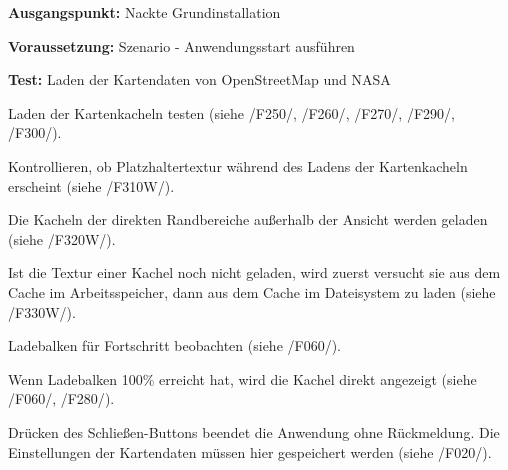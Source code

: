 \documentclass[10pt]{scrreprt}
\newcommand{\sfbf}[1]{\textbf{\sffamily #1}}
\newcommand{\ziel}[1]{{\fontsize{9.5}{11}\textsf{/#1/}}}
\newcommand{\ziellabel}{Z}
\newcommand{\muss}{\renewcommand{\labelenumi}{\textbf{\ziel{\ziellabel\numprint{\theenumi}0}}}}
\newcommand{\wunsch}{\renewcommand{\labelenumi}{\textbf{\ziel{\ziellabel\numprint{\theenumi}0W}}}}
\newenvironment{details}[1][6pt]{%
  \parskip#1 \parindent6mm \raggedright%
  \def\item{\par\ignorespaces\hangindent=5mm \hangafter1}}{%
  \par\ignorespaces}
\begin{document}
\vspace{1.0cm}
\begin{details}[2pt]
\item \sfbf{Ausgangspunkt:} Nackte Grundinstallation \\
\item \sfbf{Voraussetzung:} Szenario - Anwendungsstart ausführen
\item \sfbf{Test:} Laden der Kartendaten von OpenStreetMap und NASA \\
\end{details}
\vspace{2mm}
\begin{enumerate}[leftmargin = 2.2cm, resume]
\item Laden der Kartenkacheln testen (siehe \ziel{F250}, \ziel{F260}, \ziel{F270}, \ziel{F290}, \ziel{F300}).
\wunsch
\item Kontrollieren, ob Platzhaltertextur während des Ladens der Kartenkacheln erscheint (siehe \ziel{F310W}).
\item Die Kacheln der direkten Randbereiche außerhalb der Ansicht werden geladen (siehe \ziel{F320W}).
\item Ist die Textur einer Kachel noch nicht geladen, wird zuerst versucht sie aus dem Cache im Arbeitsspeicher, dann aus dem Cache im Dateisystem zu laden (siehe \ziel{F330W}).
\muss
\item Ladebalken für Fortschritt beobachten (siehe \ziel{F060}).
\item Wenn Ladebalken 100\% erreicht hat, wird die Kachel direkt angezeigt (siehe \ziel{F060}, \ziel{F280}).
\item Drücken des Schließen-Buttons beendet die Anwendung ohne Rückmeldung. Die Einstellungen der Kartendaten müssen hier gespeichert werden (siehe \ziel{F020}).
\end{enumerate}
\end{document}
